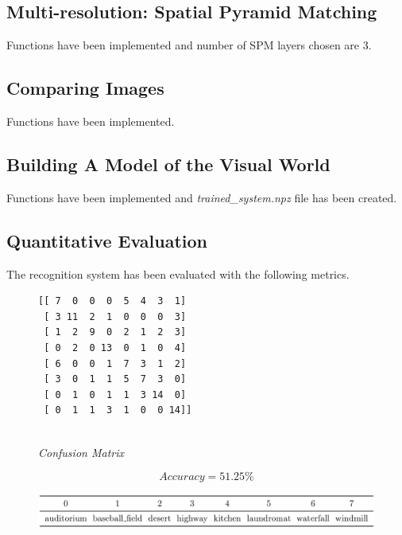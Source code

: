 \documentclass[a4paper]{article}
\begin{document}
\subsection{Multi-resolution: Spatial Pyramid Matching}
Functions have been implemented and number of SPM layers chosen are 3.

\subsection{Comparing Images}
Functions have been implemented.

\subsection{Building A Model of the Visual World}
Functions have been implemented and \textit{trained\_system.npz} file has been created.

\subsection{Quantitative Evaluation}
The recognition system has been evaluated with the following metrics.

\begin{figure}[!ht]
\centering
\begin{BVerbatim}
[[ 7  0  0  0  5  4  3  1]
 [ 3 11  2  1  0  0  0  3]
 [ 1  2  9  0  2  1  2  3]
 [ 0  2  0 13  0  1  0  4]
 [ 6  0  0  1  7  3  1  2]
 [ 3  0  1  1  5  7  3  0]
 [ 0  1  0  1  1  3 14  0]
 [ 0  1  1  3  1  0  0 14]]
\end{BVerbatim}
\bigskip
\\
\textit{Confusion Matrix}
\end{figure}

\begin{equation*}
    Accuracy = 51.25\%
\end{equation*}

\begin{figure}[!ht]
    \centering
    \includegraphics[width=\textwidth]{labels}
\end{figure}
\end{document}
